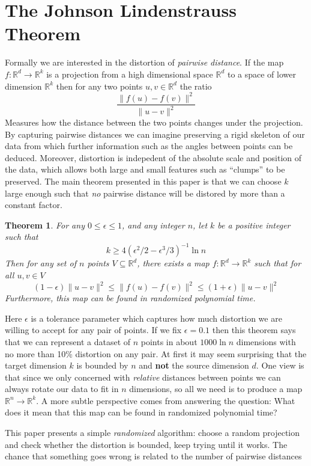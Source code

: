 \documentclass[11pt]{article}
\newcommand{\arr}{\rightarrow}
\newcommand{\R}{\mathbb{R}}
\newtheorem{Thm}{Theorem}
\begin{document}
\section{The Johnson Lindenstrauss Theorem}
Formally we are interested in the distortion of \textit{pairwise distance}. If the map $f : \R^d \arr \R^k$ is a projection from a high dimensional space $\R^d$ to a space of lower dimension $\R^k$ then for any two points $u, v \in \R^d$ the ratio
\[ \frac{\| f(u) - f(v) \|^2}{\| u - v \|^2} \]
Measures how the distance between the two points changes under the projection. By capturing pairwise distances we can imagine preserving a rigid skeleton of our data from which further information such as the angles between points can be deduced. Moreover, distortion is indepedent of the absolute scale and position of the data, which allows both large and small features such as ``clumps'' to be preserved. The main theorem presented in this paper \cite{mainpaper} is that we can choose $k$ large enough such that \textit{no} pairwise distance will be distored by more than a constant factor.

\begin{Thm}
  For any $0 \leq \epsilon \leq 1$, and any integer $n$, let $k$ be a positive
  integer such that
  \[ 
    k \geq 4(\epsilon^2/2 - \epsilon^3/3)^{-1} \ln n 
  \]
  Then for any set of $n$ points $V \subseteq \R^d$, there exists a map
  $f:\R^d \arr \R^k$ such that for all $u, v \in V$
  \[
    (1-\epsilon)\|u - v\|^2 \leq \| f(u) - f(v) \|^2 \leq (1+\epsilon) \| u - v \|^2 
  \]
  Furthermore, this map can be found in randomized polynomial time.
\end{Thm}

Here $\epsilon$ is a tolerance parameter which captures how much distortion we are willing to accept for any pair of points. If we fix $\epsilon = 0.1$ then this theorem says that we can represent a dataset of $n$ points in about $1000 \ln n$ dimensions with no more than 10\% distortion on any pair. At first it may seem surprising that the target dimension $k$ is bounded by $n$ and \textbf{not} the source dimension $d$. One view is that since we only concerned with \textit{relative} distances between points we can always rotate our data to fit in $n$ dimensions, so all we need is to produce a map $\R^n \arr \R^k$. A more subtle perspective comes from answering the question: What does it mean that this map can be found in randomized polynomial time?

This paper presents a simple \textit{randomized} algorithm: choose a random projection and check whether the distortion is bounded, keep trying until it works. The chance that something goes wrong is related to the number of pairwise distances 
\end{document}
